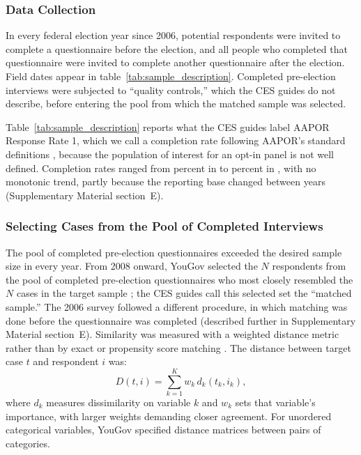 \documentclass[12pt]{article}
\begin{document}
\subsubsection*{Data Collection}
In every federal election year since 2006, potential respondents were invited to complete a questionnaire before the election, and all people who completed that questionnaire were invited to complete another questionnaire after the election. Field dates appear in table~\ref{tab:sample_description}. Completed pre-election interviews were subjected to ``quality controls,'' which the CES guides do not describe, before entering the pool from which the matched sample was selected.

Table~\ref{tab:sample_description} reports what the CES guides label AAPOR Response Rate 1, which we call a completion rate following AAPOR's standard definitions \parencite[78]{aapor2023}, because the population of interest for an opt-in panel is not well defined. Completion rates ranged from \CompletionRateMin{} percent in \CompletionRateMinYear{} to \CompletionRateMax{} percent in \CompletionRateMaxYear{}, with no monotonic trend, partly because the reporting base changed between years (Supplementary Material section~E).



\subsubsection*{Selecting Cases from the Pool of Completed Interviews}
The pool of completed pre-election questionnaires exceeded the desired sample size in every year. From 2008 onward, YouGov selected the $N$ respondents from the pool of completed pre-election questionnaires who most closely resembled the $N$ cases in the target sample \parencite{rivers_sampling_2007}; the CES guides call this selected set the ``matched sample.'' The 2006 survey followed a different procedure, in which matching was done before the questionnaire was completed (described further in Supplementary Material section~E). Similarity was measured with a weighted distance metric rather than by exact or propensity score matching \parencite{stuart_matching_2010}. The distance between target case $t$ and respondent $i$ was:
\[
D(t,i) = \sum_{k=1}^{K} w_{k} \, d_{k}(t_{k}, i_{k}),
\]
where $d_{k}$ measures dissimilarity on variable $k$ and $w_{k}$ sets that variable's importance, with larger weights demanding closer agreement. For unordered categorical variables, YouGov specified distance matrices between pairs of categories.
\end{document}

